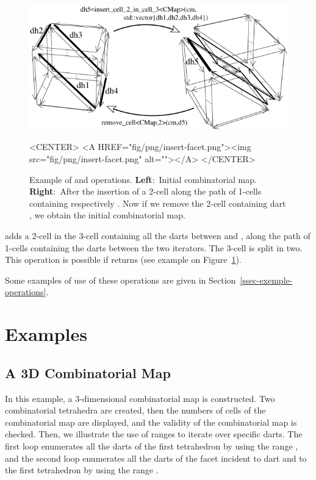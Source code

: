 \begin{figure}[htb]
  \begin{ccTexOnly}
    \begin{center}
      \includegraphics[width=.75\textwidth]{Combinatorial_map/fig/pdf/insert-facet}
    \end{center}
  \end{ccTexOnly}
  \begin{ccHtmlOnly}
    <CENTER> <A HREF="fig/png/insert-facet.png"><img
    src="fig/png/insert-facet.png" alt=""></A> </CENTER>
  \end{ccHtmlOnly}
  \caption{Example of  and
     operations. \textbf{Left}:~Initial
    combinatorial map.  \textbf{Right}:~After the insertion of a
    2-cell along the path of 1-cells containing respectively
    .  Now if we remove the 2-cell containing dart
    , we obtain the initial combinatorial map.}
  \label{fig-insert-face}
\end{figure}
{} adds a
2-cell in the 3-cell containing all the darts between
 and , along the path of 1-cells
containing the darts between the two iterators. The 3-cell is
split in two. This operation is possible if
 returns
 (see example on Figure~\ref{fig-insert-face}).

Some examples of use of these operations are given in
Section~\ref{ssec-exemple-operations}.

\section{Examples}

\subsection{A 3D Combinatorial Map}\label{ssec-example-3DCM}
In this example, a 3-dimensional combinatorial map is constructed. Two
combinatorial tetrahedra are created, then the numbers of cells of the
combinatorial map are displayed, and the validity of the combinatorial
map is checked.  Then, we illustrate the use of ranges to iterate over
specific darts.  The first loop enumerates all the darts of the first
tetrahedron by using the range , and the
second loop enumerates all the darts of the facet incident to dart
 and to the first tetrahedron by using the range
.

